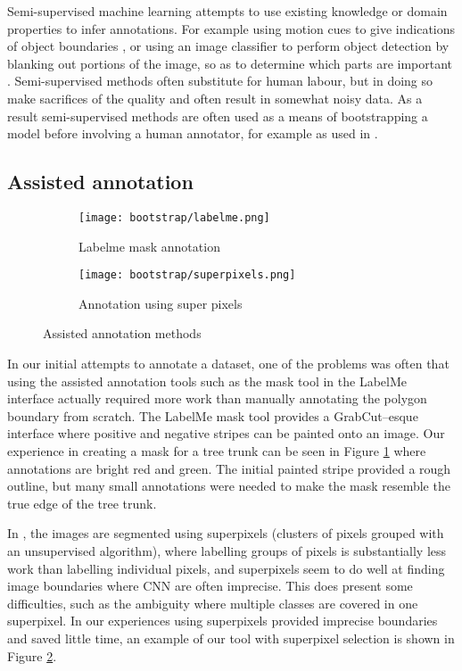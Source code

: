 Semi-supervised machine learning attempts to use existing knowledge or domain properties to infer annotations. For example using motion cues to give indications of object boundaries \cite{Hong2017}, or using an image classifier to perform object detection by blanking out portions of the image, so as to determine which parts are important \cite{Bazzani2016}. Semi-supervised methods often substitute for human labour, but in doing so make sacrifices of the quality and often result in somewhat noisy data. As a result semi-supervised methods are often used as a means of bootstrapping a model before involving a human annotator, for example as used in \cite{Papadopoulos2016}.


\subsection {Assisted annotation}


\begin{figure}[ht]
\centering
\begin{subfigure}{.25\textwidth}
  \centering
  \texttt{[image: bootstrap/labelme.png]}
  \caption{Labelme mask annotation}  
  \label{fig:bootstrap_labelme}
\end{subfigure}%
\begin{subfigure}{.25\textwidth}
  \centering
  \texttt{[image: bootstrap/superpixels.png]}
  \caption{Annotation using super pixels}
  \label{fig:bootstrap_superpixels}
\end{subfigure}

\caption{Assisted annotation methods}
\label{fig:bootstrap_annot_method}
\end{figure}


In our initial attempts to annotate a dataset, one of the problems was often that using the assisted annotation tools such as the mask tool in the LabelMe \cite{Russell2007} interface actually required more work than manually annotating the polygon boundary from scratch. The LabelMe mask tool provides a GrabCut--esque interface where positive and negative stripes can be painted onto an image. Our experience in creating a mask for a tree trunk can be seen in Figure \ref{fig:bootstrap_labelme} where annotations are bright red and green. The initial painted stripe provided a rough outline, but many small annotations were needed to make the mask resemble the true edge of the tree trunk.

In \cite{Galloway2017}, the images are segmented using superpixels (clusters of pixels grouped with an unsupervised algorithm), where labelling groups of pixels is substantially less work than labelling individual pixels, and superpixels seem to do well at finding image boundaries where \gls{CNN} are often imprecise. This does present some difficulties, such as the ambiguity where multiple classes are covered in one superpixel. In our experiences using superpixels provided imprecise boundaries and saved little time, an example of our tool with superpixel selection is shown in Figure \ref{fig:bootstrap_superpixels}.

